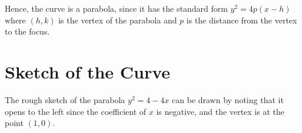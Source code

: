 \documentclass{article}
\begin{document}
Hence, the curve is a parabola, since it has the standard form \( y^2 = 4p(x - h) \) where \( (h, k) \) is the vertex of the parabola and \( p \) is the distance from the vertex to the focus.

\section*{Sketch of the Curve}
The rough sketch of the parabola \( y^2 = 4 - 4x \) can be drawn by noting that it opens to the left since the coefficient of \(x\) is negative, and the vertex is at the point \( (1, 0) \).

\end{document}
